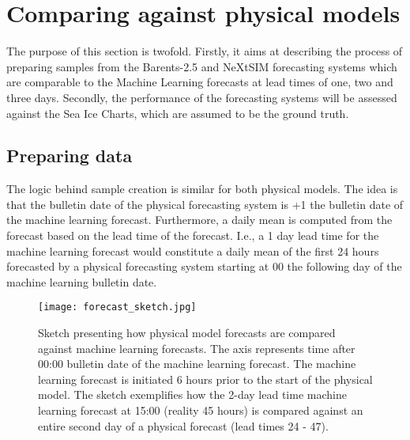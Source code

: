 \documentclass[../main/thesis.tex]{subfiles}
\begin{document}
\section{Comparing against physical models}
The purpose of this section is twofold. Firstly, it aims at describing the process of preparing samples from the Barents-2.5 and NeXtSIM forecasting systems which are comparable to the Machine Learning forecasts at lead times of one, two and three days. Secondly, the performance of the forecasting systems will be assessed against the Sea Ice Charts, which are assumed to be the ground truth.

\subsection{Preparing data}
The logic behind sample creation is similar for both physical models. The idea is that the bulletin date of the physical forecasting system is +1 the bulletin date of the machine learning forecast. Furthermore, a daily mean is computed from the forecast based on the lead time of the forecast. I.e., a 1 day lead time for the machine learning forecast would constitute a daily mean of the first 24 hours forecasted by a physical forecasting system starting at 00 the following day of the machine learning bulletin date. 

\begin{figure}
    \texttt{[image: forecast\_sketch.jpg]}
    \caption{\label{fig:physical_pipeline}Sketch presenting how physical model forecasts are compared against machine learning forecasts. The axis represents time after 00:00 bulletin date of the machine learning forecast. The machine learning forecast is initiated 6 hours prior to the start of the physical model. The sketch exemplifies how the 2-day lead time machine learning forecast at 15:00 (reality 45 hours) is compared against an entire second day of a physical forecast (lead times 24 - 47).}
\end{figure}


\biblio
\end{document}
